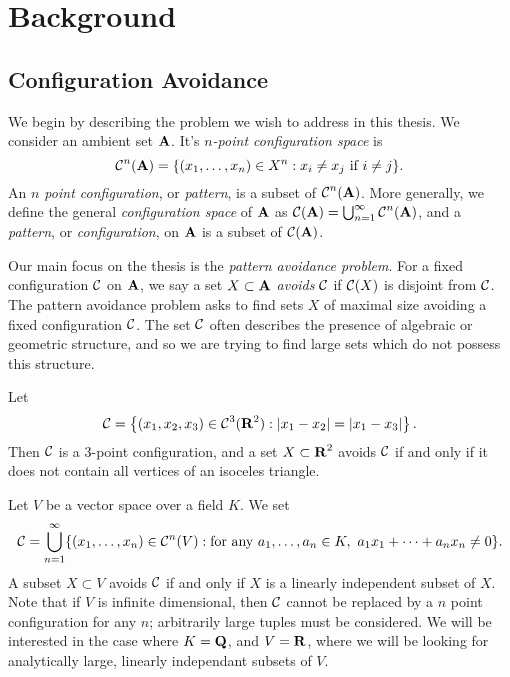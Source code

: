 
\chapter{Background}
\label{ch:Background}

\section{Configuration Avoidance}

We begin by describing the problem we wish to address in this thesis. We consider an ambient set $\operatorname{\mathbf{A}}$. It's \emph{$n$-point configuration space} is
%
\[ \operatorname{\mathcal{C}}^n(\operatorname{\mathbf{A}}) = \{ (x_1, \dots, x_n) \in X^n: x_i \neq x_j\ \text{if $i \neq j$} \}. \]
%
An \emph{$n$ point configuration}, or \emph{pattern}, is a subset of $\operatorname{\mathcal{C}}^n(\operatorname{\mathbf{A}})$. More generally, we define the general \emph{configuration space} of $\operatorname{\mathbf{A}}$ as $\operatorname{\mathcal{C}}(\operatorname{\mathbf{A}}) = \bigcup_{n = 1}^\infty \operatorname{\mathcal{C}}^n(\operatorname{\mathbf{A}})$, and a \emph{pattern}, or \emph{configuration}, on $\operatorname{\mathbf{A}}$ is a subset of $\operatorname{\mathcal{C}}(\operatorname{\mathbf{A}})$.

Our main focus on the thesis is the \emph{pattern avoidance problem}. For a fixed configuration $\operatorname{\mathcal{C}}$ on $\operatorname{\mathbf{A}}$, we say a set $X \subset \operatorname{\mathbf{A}}$ \emph{avoids} $\operatorname{\mathcal{C}}$ if $\operatorname{\mathcal{C}}(X)$ is disjoint from $\operatorname{\mathcal{C}}$. The pattern avoidance problem asks to find sets $X$ of maximal size avoiding a fixed configuration $\operatorname{\mathcal{C}}$. The set $\operatorname{\mathcal{C}}$ often describes the presence of algebraic or geometric structure, and so we are trying to find large sets which do not possess this structure.

\begin{example}
	Let
	\[ \operatorname{\mathcal{C}} = \left\{ (x_1, x_2, x_3) \in \operatorname{\mathcal{C}}^3(\operatorname{\mathbf{R}}^2) : |x_1-x_2| = |x_1-x_3| \right\}. \]
	Then $\operatorname{\mathcal{C}}$ is a 3-point configuration, and a set $X \subset \operatorname{\mathbf{R}}^2$ avoids $\operatorname{\mathcal{C}}$ if and only if it does not contain all vertices of an isoceles triangle. %
\end{example}

\begin{example}
	Let $V$ be a vector space over a field $K$. We set
	\[ \operatorname{\mathcal{C}} = \bigcup_{n = 1}^\infty \{ (x_1, \dots, x_n) \in \operatorname{\mathcal{C}}^n(V): \text{for any}\ a_1, \dots, a_n \in K,\ a_1x_1 + \dots + a_nx_n \neq 0 \}. \]
	A subset $X \subset V$ avoids $\operatorname{\mathcal{C}}$ if and only if $X$ is a linearly independent subset of $X$. Note that if $V$ is infinite dimensional, then $\operatorname{\mathcal{C}}$ cannot be replaced by a $n$ point configuration for any $n$; arbitrarily large tuples must be considered. We will be interested in the case where $K = \operatorname{\mathbf{Q}}$, and $V = \operatorname{\mathbf{R}}$, where we will be looking for analytically large, linearly independant subsets of $V$.
\end{example}

